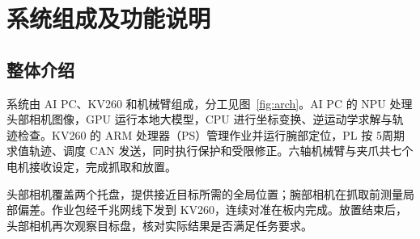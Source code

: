 \section{系统组成及功能说明}

\subsection{整体介绍}

系统由 AI PC、KV260 和机械臂组成，分工见图~\ref{fig:arch}。AI PC 的 NPU 处理头部相机图像，GPU 运行本地大模型，CPU 进行坐标变换、逆运动学求解与轨迹检查。KV260 的 ARM 处理器（PS）管理作业并运行腕部定位，PL 按 5\ms 周期求值轨迹、调度 CAN 发送，同时执行保护和受限修正。六轴机械臂与夹爪共七个电机接收设定，完成抓取和放置。

头部相机覆盖两个托盘，提供接近目标所需的全局位置；腕部相机在抓取前测量局部偏差。作业包经千兆网线下发到 KV260，连续对准在板内完成。放置结束后，头部相机再次观察目标盘，核对实际结果是否满足任务要求。


